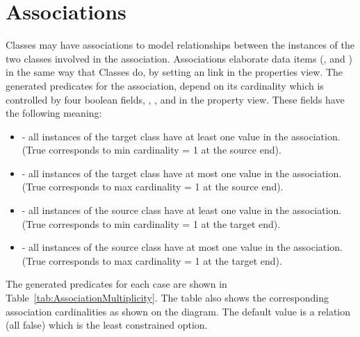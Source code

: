 \section{Associations}
\label{sec:classdiagrams-associations}

Classes may have associations to model relationships between the instances of the two classes involved in the association.
Associations elaborate data items (,  and ) in the same way that Classes do, by setting an  link in the properties view.
The generated predicates for the association, depend on its cardinality which is controlled by four boolean fields, , ,  and  in the property view.
These fields have the following meaning:
\begin{itemize}
	\item {} - all instances of the target class have at least one value in the association. (True corresponds to min cardinality = 1 at the source end).
	\item {} - all instances of the target class have at most one value in the association. (True corresponds to max cardinality = 1 at the source end). 
	\item {} - all instances of the source class have at least one value in the association. (True corresponds to min cardinality = 1 at the target end).
	\item {} - all instances of the source class have at most one value in the association. (True corresponds to max cardinality = 1 at the target end).
\end{itemize}

The generated predicates for each case are shown in Table~\ref{tab:AssociationMultiplicity}. The table also shows the corresponding association cardinalities as shown on the diagram. 
The default value is a relation (all false) which is the least constrained option.

